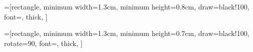 
=[rectangle,
                     minimum width=1.3cm,
                     minimum height=0.8cm,
                     draw=black!100,
                     font=\small,
                     thick,
                    ]

=[rectangle,
                     minimum width=1.3cm,
                     minimum height=0.7cm,
                     draw=black!100,
                     rotate=90,
                     font=\small,
                     thick,
                    ]

